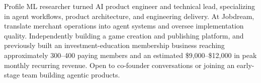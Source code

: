 \documentclass{resume}
\begin{document}
\begin{rSection}{Profile}
ML researcher turned AI product engineer and technical lead, specializing in
agent workflows, product architecture, and engineering delivery. At Jobdream,
translate merchant operations into agent systems and oversee implementation quality.
Independently building a game creation and publishing platform, and previously built
an investment-education membership business reaching approximately 300--400 paying
members and an estimated \$9,000--\$12,000 in peak monthly recurring revenue. Open to co-founder conversations or joining an
early-stage team building agentic products.
\end{rSection}
\end{document}
